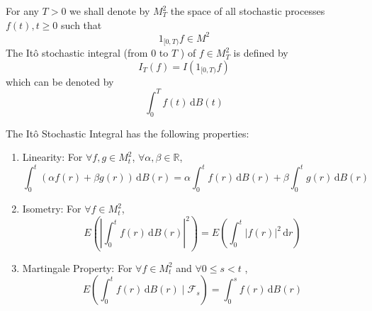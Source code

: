 \begin{definition}

\end{definition}

\begin{definition}
    For any $T>0$ we shall denote by $M_{T}^{2}$ the space of all stochastic processes $f(t), t \geq 0$ such that
    \begin{equation*}
        1_{[0,T)}f\in M^{2}
    \end{equation*}
    The It\^o stochastic integral (from $0$ to $T$ ) of $f\in M_{T}^{2}$ is defined by
    \begin{equation}
        I_{T}(f)=I\left(1_{[0,T)}f\right)
    \end{equation}
    which can be denoted by
    \begin{equation}
        \int_{0}^{T}f(t)\,\mathrm{d}B(t)
    \end{equation}
\end{definition}

\begin{property}
    The It\^o Stochastic Integral has the following properties:
    \begin{enumerate}
        \item Linearity: For $\forall f,g\in M_{t}^{2}$, $\forall \alpha,\beta\in\mathbb{R}$,
              \begin{equation}
                  \int_{0}^{t}(\alpha f(r)+\beta g(r))\,\mathrm{d}B(r)=\alpha \int_{0}^{t}f(r)\,\mathrm{d}B(r)+\beta\int_{0}^{t}g(r)\,\mathrm{d}B(r)
              \end{equation}
        \item Isometry: For $\forall f\in M_{t}^{2}$,
              \begin{equation}
                  E\left(\left|\int_{0}^{t}f(r)\,\mathrm{d}B(r)\right|^{2}\right)=E\left(\int_{0}^{t}|f(r)|^{2}\,\mathrm{d}r\right)
              \end{equation}
        \item Martingale Property: For $\forall f\in M_{t}^{2}$ and  $\forall 0\leq s<t$ ,
              \begin{equation}
                  E\left(\int_{0}^{t}f(r)\,\mathrm{d}B(r)\mid\mathcal{F}_{s}\right)=\int_{0}^{s}f(r)\,\mathrm{d}B(r)
              \end{equation}
    \end{enumerate}
\end{property}

